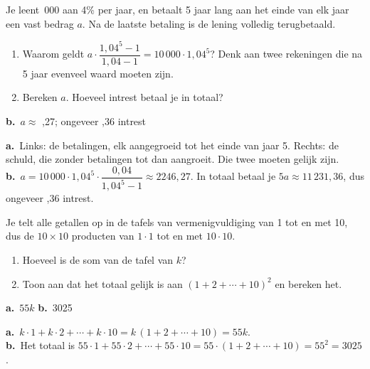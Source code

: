 \begin{oefeningen}
\begin{oefening}[3]
Je leent \,000 aan 4\% per jaar, en betaalt 5 jaar lang aan het einde van elk jaar een vast bedrag $a$. Na de laatste betaling is de lening volledig terugbetaald.
\begin{enumerate}
  \item Waarom geldt $a \cdot \dfrac{1{,}04^5 - 1}{1{,}04 - 1} = 10\,000 \cdot 1{,}04^5$? Denk aan twee rekeningen die na 5 jaar evenveel waard moeten zijn.
  \item Bereken $a$. Hoeveel intrest betaal je in totaal?
\end{enumerate}
\begin{solution}
\textbf{b.}~$a\approx$ ,27; ongeveer ,36 intrest
\end{solution}
\begin{fullsolution}
\textbf{a.}~Links: de betalingen, elk aangegroeid tot het einde van jaar 5. Rechts: de schuld, die zonder betalingen tot dan aangroeit. Die twee moeten gelijk zijn.\\
\textbf{b.}~$a=10\,000\cdot 1{,}04^5\cdot\dfrac{0{,}04}{1{,}04^5-1}\approx 2246{,}27$. In totaal betaal je $5a\approx 11\,231{,}36$, dus ongeveer ,36 intrest.
\end{fullsolution}
\end{oefening}

\begin{oefening}[3]
Je telt alle getallen op in de tafels van vermenigvuldiging van 1 tot en met 10, dus de $10 \times 10$ producten van $1 \cdot 1$ tot en met $10 \cdot 10$.
\begin{enumerate}
  \item Hoeveel is de som van de tafel van $k$?
  \item Toon aan dat het totaal gelijk is aan $(1 + 2 + \cdots + 10)^2$ en bereken het.
\end{enumerate}
\begin{solution}
\textbf{a.}~$55k$ \quad \textbf{b.}~3025
\end{solution}
\begin{fullsolution}
\textbf{a.}~$k\cdot 1+k\cdot 2+\cdots+k\cdot 10=k\,(1+2+\cdots+10)=55k$.\\
\textbf{b.}~Het totaal is $55\cdot 1+55\cdot 2+\cdots+55\cdot 10=55\cdot(1+2+\cdots+10)=55^2=3025$.
\end{fullsolution}
\end{oefening}


\end{oefeningen}
